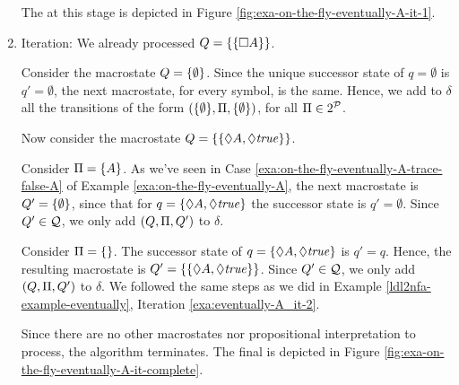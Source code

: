 \begin{example}
\begin{enumerate}
		The \DFA at this stage is depicted in Figure \ref{fig:exa-on-the-fly-eventually-A-it-1}.
		
		\item Iteration: We already processed $Q=\{\{\Box A\}\}$.
		
		Consider the macrostate $Q = \{\emptyset\}$. Since 
		the unique successor state of $q=\emptyset$ is $q'=\emptyset$, the next macrostate, for every symbol, is the same. Hence, we add to $\delta$ all the transitions of the form $(\{\emptyset\}, \Pi, \{\emptyset\})$, for all $\Pi \in 2^{\mathcal{P}}$.
		
		Now consider the macrostate $Q = \{\{\Diamond A, \Diamond \mathit{true}\}\}$. 
		
		Consider $\Pi = \{A\}$. As we've seen in Case \ref{exa:on-the-fly-eventually-A-trace-false-A} of Example \ref{exa:on-the-fly-eventually-A}, the next macrostate is $Q'=\{\emptyset\}$, since that for $q = \{\Diamond A, \Diamond \mathit{true}\}$ the successor state is $q'=\emptyset$. Since $Q'\in \mathcal{Q}$, we only add $(Q, \Pi, Q')$ to $\delta$.
		
		Consider $\Pi = \{\}$. The successor state of $q = \{\Diamond A, \Diamond \mathit{true}\}$ is $q' = q$.
		Hence, the resulting macrostate is $Q' = \{\{\Diamond A, \Diamond \mathit{true}\}\}$. Since $Q'\in \mathcal{Q}$, we only add $(Q, \Pi, Q')$ to $\delta$. We followed the same steps as we did in Example \ref{ldl2nfa-example-eventually}, Iteration  \ref{exa:eventually-A_it-2}.
		
		Since there are no other macrostates nor propositional interpretation to process, the algorithm terminates. The final \DFA is depicted in Figure \ref{fig:exa-on-the-fly-eventually-A-it-complete}.
		
	\end{enumerate}
	

\end{example}

